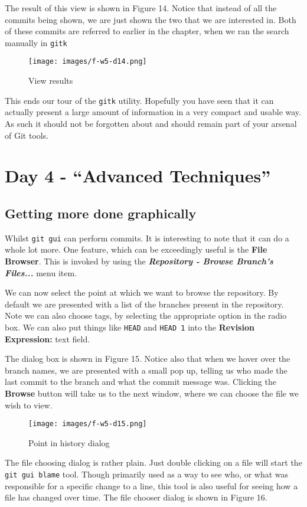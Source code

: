 The result of this view is shown in Figure 14.  Notice that instead of all the commits being shown, we are just shown the two that we are interested in.  Both of these commits are referred to earlier in the chapter, when we ran the search manually in \texttt{gitk}

\begin{figure}[hbt]
\centering
\texttt{[image: images/f-w5-d14.png]}
\caption{View results}
\end{figure} 

This ends our tour of the \texttt{gitk} utility.  Hopefully you have seen that it can actually present a large amount of information in a very compact and usable way.  As such it should not be forgotten about and should remain part of your arsenal of Git tools.

\section{Day 4 - ``Advanced Techniques''}
\subsection{Getting more done graphically}
Whilst \texttt{git gui} can perform commits.  It is interesting to note that it can do a whole lot more.  One feature, which can be exceedingly useful is the \textbf{File Browser}.  This is invoked by using the \textbf{\emph{Repository - Browse Branch's Files...}} menu item.

We can now select the point at which we want to browse the repository.  By default we are presented with a list of the branches present in the repository.  Note we can also choose tags, by selecting the appropriate option in the radio box.  We can also put things like \texttt{HEAD} and \texttt{HEAD~1} into the \textbf{Revision Expression:} text field.  

The dialog box is shown in Figure 15.  Notice also that when we hover over the branch names, we are presented with a small pop up, telling us who made the last commit to the branch and what the commit message was.  Clicking the \textbf{Browse} button will take us to the next window, where we can choose the file we wish to view.

\begin{figure}[hbt]
\centering
\texttt{[image: images/f-w5-d15.png]}
\caption{Point in history dialog}
\end{figure} 

The file choosing dialog is rather plain.  Just double clicking on a file will start the \texttt{git gui blame} tool.  Though primarily used as a way to see who, or what was responsible for a specific change to a line, this tool is also useful for seeing how a file has changed over time.  The file chooser dialog is shown in Figure 16.

